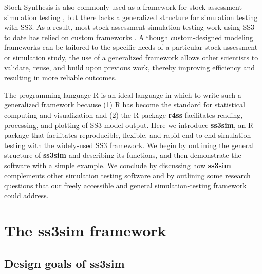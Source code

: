 \documentclass[10pt]{article}
\newcommand{\R}[1]{\label{#1}\linelabel{#1}}
\begin{document}
Stock Synthesis is also commonly used as a framework for stock assessment
simulation testing \cite{helu2000, yin2004, schirripa2009, lee2011, jiao2012,
  lee2012, crone2013a, hurtadoferro2013}, \R{B12}but there lacks a generalized
structure for simulation testing with SS3. As a result, most stock
assessment simulation-testing work using SS3 to date has relied on custom
frameworks \cite{helu2000, yin2004, magnusson2007, wetzel2011a, jiao2012,
  wilberg2006, deroba2013, deroba2014, crone2013a, hurtadoferro2013}.
\R{A1:2}Although custom-designed modeling frameworks can be tailored to the
specific needs of a particular stock assessment or simulation study, the use of
a generalized framework allows other scientists to validate, reuse, and build
upon previous work, thereby improving efficiency and resulting in more reliable
outcomes.

The programming language \textsf{R} \cite{rcoreteam2013} is an ideal language
in which to write such a generalized framework because (1) \textsf{R} has
become the standard for statistical computing and visualization and (2) the
\textsf{R} package \textbf{r4ss} \cite{r4ss2013} facilitates reading,
processing, and plotting of SS3 model output. Here we introduce
\textbf{ss3sim}, an \textsf{R} package that facilitates \R{B3:1}reproducible,
flexible, and rapid end-to-end simulation testing with the widely-used SS3
framework. We begin by outlining the general structure of \textbf{ss3sim} and
describing its functions, and then demonstrate the software with a simple
example. We conclude by discussing how \textbf{ss3sim} complements other
simulation testing software and by outlining some research questions that our
freely accessible and general simulation-testing framework could address.

\section*{The ss3sim framework}

\subsection*{Design goals of ss3sim}
\end{document}
